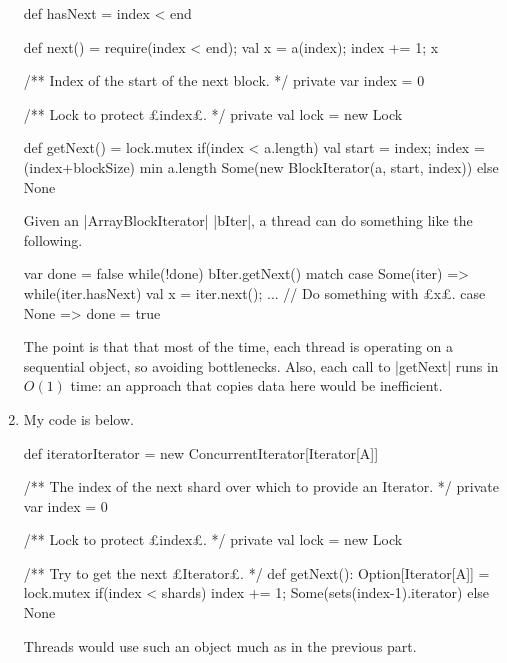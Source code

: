 \begin{answerI}
\begin{enumerate}
\begin{scala}
{{    def hasNext = index < end

    def next() = { require(index < end); val x = a(index); index += 1; x }
  }

  /** Index of the start of the next block. */
  private var index = 0

  /** Lock to protect £index£. */
  private val lock = new Lock

  def getNext() = lock.mutex{
    if(index < a.length){
      val start = index; index = (index+blockSize) min a.length
      Some(new BlockIterator(a, start, index))
    }
    else None
  }
}
\end{scala}
%
Given an |ArrayBlockIterator| |bIter|, a thread can do something like the
following.
%
\begin{scala}
  var done = false
  while(!done) bIter.getNext() match{
    case Some(iter) => 
      while(iter.hasNext){ 
        val x = iter.next(); ... // Do something with £x£. 
      }
    case None => done = true
  }
\end{scala}

The point is that that most of the time, each thread is operating on a
sequential object, so avoiding bottlenecks.  Also, each call to |getNext| runs
in $O(1)$ time: an approach that copies data here would be inefficient.


\item
My code is below.
\begin{scala}
  def iteratorIterator = new ConcurrentIterator[Iterator[A]]{
    /** The index of the next shard over which to provide an Iterator. */
    private var index = 0

    /** Lock to protect £index£. */
    private val lock = new Lock

    /** Try to get the next £Iterator£. */
    def getNext(): Option[Iterator[A]] = lock.mutex{
      if(index < shards){ index += 1; Some(sets(index-1).iterator) } else None
    }
  }
\end{scala}
%
Threads would use such an object much as in the previous part.
\end{enumerate}
\end{answerI}
